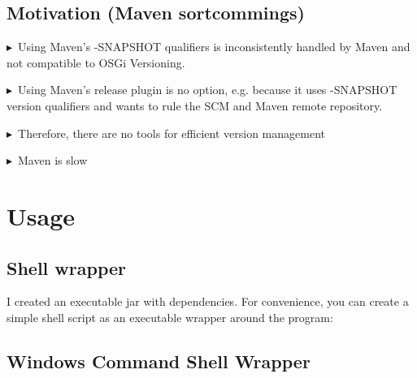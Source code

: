 \documentclass[a4paper,11pt,english,oneside,halfparskip]{scrartcl}
\newcommand{\G}{\par\noindent\ensuremath{\blacktriangleright}~}
\newcommand{\code}[1]{\texttt{#1}}
\begin{document}
\subsection{Motivation (Maven sortcommings)}
\G Using Maven's -SNAPSHOT qualifiers is inconsistently handled by Maven and not compatible to OSGi Versioning.
\G Using Maven's release plugin is no option, e.g. because it uses -SNAPSHOT version qualifiers and wants to rule the SCM and Maven remote repository.
\G Therefore, there are no tools for efficient version management
\G Maven is slow

\section{Usage}

\subsection{Shell wrapper}

I created an executable jar with dependencies. For convenience, you can create a simple shell script as an executable wrapper around the program:


\subsection{Windows Command Shell Wrapper}
\end{document}
